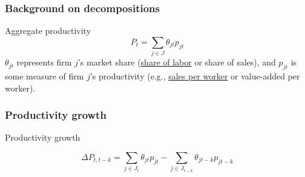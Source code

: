 \begin{frame}
\frametitle{Background on decompositions}
\begin{block}{Aggregate productivity}
\begin{equation}
P_t = \sum_{j \in J} \theta_{jt}p_{jt}
\end{equation}
$\theta_{jt}$ represents firm $j$'s market share (\underline{share of labor} or share of sales), and $p_{jt}$ is some measure of firm $j$'s  productivity (e.g., \underline{sales per worker} or value-added per worker).
\end{block}
\end{frame}

\begin{frame}
\frametitle{Productivity growth}
\begin{block}{Productivity growth}

\begin{equation}
\Delta P_{t,t-k} = \sum_{j \in J_t} \theta_{jt} p_{jt} - \sum_{j \in J_{t-k}} \theta_{jt-k} p_{jt-k}
\end{equation}

\end{block}
\end{frame}

